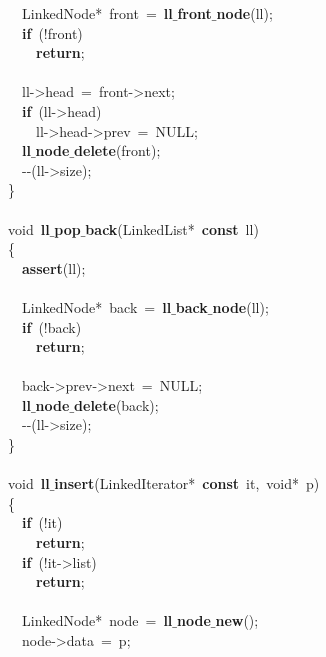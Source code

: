 \documentclass{article}
\begin{document}
\mbox{}\ \ LinkedNode*\ front\ =\ \textbf{ll$\_$front$\_$node}(ll); \\
\mbox{}\ \ \textbf{if}\ (!front) \\
\mbox{}\ \ \ \ \textbf{return}; \\
\mbox{} \\
\mbox{}\ \ ll-\textgreater{}head\ =\ front-\textgreater{}next; \\
\mbox{}\ \ \textbf{if}\ (ll-\textgreater{}head) \\
\mbox{}\ \ \ \ ll-\textgreater{}head-\textgreater{}prev\ =\ NULL; \\
\mbox{}\ \ \textbf{ll$\_$node$\_$delete}(front); \\
\mbox{}\ \ -\/-(ll-\textgreater{}size); \\
\mbox{}\} \\
\mbox{} \\
\mbox{}void\ \textbf{ll$\_$pop$\_$back}(LinkedList*\ \textbf{const}\ ll) \\
\mbox{}\{ \\
\mbox{}\ \ \textbf{assert}(ll); \\
\mbox{} \\
\mbox{}\ \ LinkedNode*\ back\ =\ \textbf{ll$\_$back$\_$node}(ll); \\
\mbox{}\ \ \textbf{if}\ (!back) \\
\mbox{}\ \ \ \ \textbf{return}; \\
\mbox{} \\
\mbox{}\ \ back-\textgreater{}prev-\textgreater{}next\ =\ NULL; \\
\mbox{}\ \ \textbf{ll$\_$node$\_$delete}(back); \\
\mbox{}\ \ -\/-(ll-\textgreater{}size); \\
\mbox{}\} \\
\mbox{} \\
\mbox{}void\ \textbf{ll$\_$insert}(LinkedIterator*\ \textbf{const}\ it,\ void*\ p) \\
\mbox{}\{ \\
\mbox{}\ \ \textbf{if}\ (!it) \\
\mbox{}\ \ \ \ \textbf{return}; \\
\mbox{}\ \ \textbf{if}\ (!it-\textgreater{}list) \\
\mbox{}\ \ \ \ \textbf{return}; \\
\mbox{} \\
\mbox{}\ \ LinkedNode*\ node\ =\ \textbf{ll$\_$node$\_$new}(); \\
\mbox{}\ \ node-\textgreater{}data\ =\ p; \\
\end{document}
